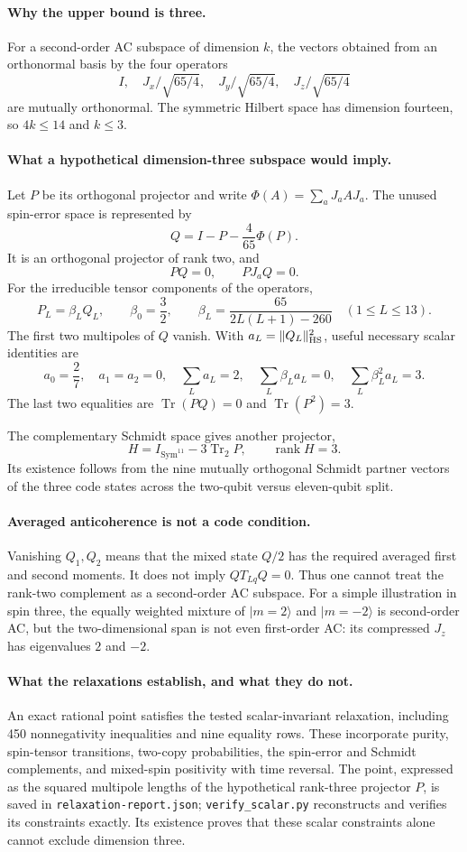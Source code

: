 \documentclass[11pt]{article}
\newcommand{\Tr}{\operatorname{Tr}}
\begin{document}
\paragraph{Why the upper bound is three.}
For a second-order AC subspace of dimension $k$, the vectors obtained from an orthonormal basis by the four operators
\[
 I,\quad J_x/\sqrt{65/4},\quad J_y/\sqrt{65/4},\quad J_z/\sqrt{65/4}
\]
are mutually orthonormal. The symmetric Hilbert space has dimension fourteen, so $4k\le14$ and $k\le3$.

\paragraph{What a hypothetical dimension-three subspace would imply.}
Let $P$ be its orthogonal projector and write
$\Phi(A)=\sum_aJ_aAJ_a$. The unused spin-error space is represented by
\[
 Q=I-P-\frac4{65}\Phi(P).
\]
It is an orthogonal projector of rank two, and
\[
 PQ=0,\qquad PJ_aQ=0.
\]
For the irreducible tensor components of the operators,
\[
 P_L=\beta_LQ_L,\qquad
 \beta_0=\frac32,\qquad
 \beta_L=\frac{65}{2L(L+1)-260}\quad(1\le L\le13).
\]
The first two multipoles of $Q$ vanish. With
$a_L=\|Q_L\|_{\rm HS}^2$, useful necessary scalar identities are
\[
 a_0=\frac27,\quad a_1=a_2=0,\quad
 \sum_La_L=2,\quad
 \sum_L\beta_La_L=0,\quad
 \sum_L\beta_L^2a_L=3.
\]
The last two equalities are $\Tr(PQ)=0$ and $\Tr(P^2)=3$.

The complementary Schmidt space gives another projector,
\[
 H=I_{\operatorname{Sym}^{11}}-3\Tr_2P,
 \qquad \operatorname{rank}H=3.
\]
Its existence follows from the nine mutually orthogonal Schmidt partner vectors of the three code states across the two-qubit versus eleven-qubit split.

\paragraph{Averaged anticoherence is not a code condition.}
Vanishing $Q_1,Q_2$ means that the mixed state $Q/2$ has the required averaged first and second moments. It does not imply $QT_{Lq}Q=0$. Thus one cannot treat the rank-two complement as a second-order AC subspace. For a simple illustration in spin three, the equally weighted mixture of $|m=2\rangle$ and $|m=-2\rangle$ is second-order AC, but the two-dimensional span is not even first-order AC: its compressed $J_z$ has eigenvalues $2$ and $-2$.

\paragraph{What the relaxations establish, and what they do not.}
An exact rational point satisfies the tested scalar-invariant relaxation, including 450 nonnegativity inequalities and nine equality rows. These incorporate purity, spin-tensor transitions, two-copy probabilities, the spin-error and Schmidt complements, and mixed-spin positivity with time reversal. The point, expressed as the squared multipole lengths of the hypothetical rank-three projector $P$, is saved in \texttt{relaxation-report.json}; \texttt{verify\_scalar.py} reconstructs and verifies its constraints exactly. Its existence proves that these scalar constraints alone cannot exclude dimension three.
\end{document}
